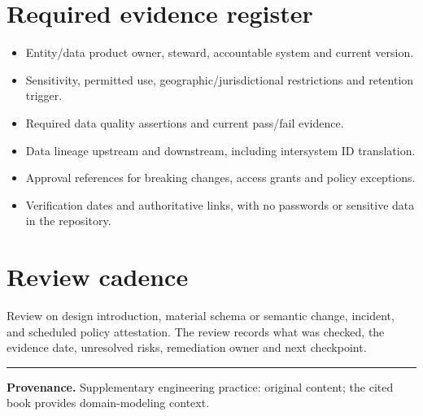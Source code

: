 \documentclass[11pt,letterpaper]{article}
\begin{document}
\section{Required evidence register}
\begin{itemize}
\item Entity/data product owner, steward, accountable system and current version.
\item Sensitivity, permitted use, geographic/jurisdictional restrictions and retention trigger.
\item Required data quality assertions and current pass/fail evidence.
\item Data lineage upstream and downstream, including intersystem ID translation.
\item Approval references for breaking changes, access grants and policy exceptions.
\item Verification dates and authoritative links, with no passwords or sensitive data in the repository.
\end{itemize}

\section{Review cadence}
Review on design introduction, material schema or semantic change, incident, and scheduled policy attestation. The review records what was checked, the evidence date, unresolved risks, remediation owner and next checkpoint.


\vfill
\hrule
{\footnotesize\textbf{Provenance.} Supplementary engineering practice: original content; the cited book provides domain-modeling context.}
\end{document}
